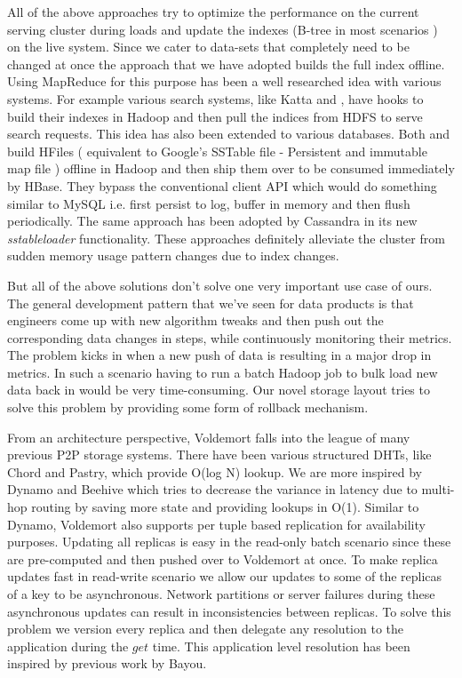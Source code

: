 \documentclass[10pt,twocolumn,preprint,natbib,authoryear]{sigplanconf}
\begin{document}
All of the above approaches try to optimize the performance on the current serving cluster during loads and update the indexes (B-tree in most scenarios ) on the live system. Since we cater to data-sets that completely need to be changed at once the approach that we have adopted builds the full index offline. Using MapReduce for this purpose has been a well researched idea with various systems. For example various search systems, like Katta\cite{10 - Katta link} and \cite{Distributed Indexing for Semantic Search}, have hooks to build their indexes in Hadoop and then pull the indices from HDFS to serve search requests. This idea has also been extended to various databases. Both \cite{11 - Distributed Indexing of Web Scale Datasets for the Cloud} and \cite{Parallel Bulk Insertion for Large-scale Analytics Applications} build HFiles ( equivalent to Google's SSTable file - Persistent and immutable map file ) offline in Hadoop and then ship them over to be consumed immediately by HBase. They bypass the conventional client API which would do something similar to MySQL i.e. first persist to log, buffer in memory and then flush periodically. The same approach has been adopted by Cassandra in its new \emph{sstableloader}\cite{http://www.datastax.com/dev/blog/bulk-loading} functionality. These approaches definitely alleviate the cluster from sudden memory usage pattern changes due to index changes. 

But all of the above solutions don't solve one very important use case of ours. The general development pattern that we've seen for data products is that engineers come up with new algorithm tweaks and then push out the corresponding data changes in steps, while continuously monitoring their metrics. The problem kicks in when a new push of data is resulting in a major drop in metrics. In such a scenario having to run a batch Hadoop job to bulk load new data back in would be very time-consuming. Our novel storage layout tries to solve this problem by providing some form of rollback mechanism. 
 
From an architecture perspective, Voldemort falls into the league of many previous P2P storage systems. There have been various structured DHTs, like Chord and Pastry, which provide O(log N) lookup. We are more inspired by Dynamo and Beehive which tries to decrease the variance in latency due to multi-hop routing by saving more state and providing lookups in O(1). Similar to Dynamo, Voldemort also supports per tuple based replication for availability purposes. Updating all replicas is easy in the read-only batch scenario since these are pre-computed and then pushed over to Voldemort at once. To make replica updates fast in read-write scenario we allow our updates to some of the replicas of a key to be asynchronous. Network partitions or server failures during these asynchronous updates can result in inconsistencies between replicas. To solve this problem we version every replica and then delegate any resolution to the application during the $get$ time. This application level resolution has been inspired by previous work by Bayou\cite{http://www2.parc.com/csl/projects/bayou/pubs/uist-97/Bayou.pdf}. 
\end{document}
